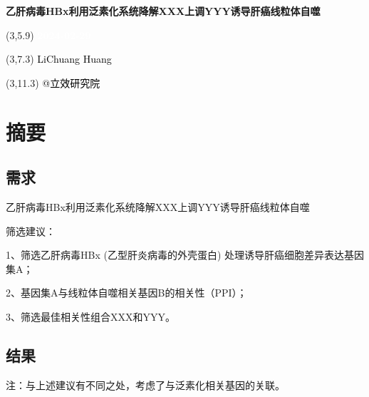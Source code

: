 \documentclass[
]{article}
\author{}
\date{\vspace{-2.5em}}
\begin{document}
\begin{titlepage} 
\begin{center} \textbf{\Huge
乙肝病毒HBx利用泛素化系统降解XXX上调YYY诱导肝癌线粒体自噬}
\vspace{4em} \begin{textblock}{10}(3,5.9) \huge
\textbf{\textcolor{white}{2024-02-29}}
\end{textblock} \begin{textblock}{10}(3,7.3)
\Large \textcolor{black}{LiChuang Huang}
\end{textblock} \begin{textblock}{10}(3,11.3)
\Large \textcolor{black}{@立效研究院}
\end{textblock} \end{center} \end{titlepage}
\restoregeometry


\tableofcontents

\listoffigures

\listoftables

\newpage


\hypertarget{abstract}{%
\section{摘要}\label{abstract}}

\hypertarget{ux9700ux6c42}{%
\subsection{需求}\label{ux9700ux6c42}}

乙肝病毒HBx利用泛素化系统降解XXX上调YYY诱导肝癌线粒体自噬

筛选建议：

1、筛选乙肝病毒HBx (乙型肝炎病毒的外壳蛋白) 处理诱导肝癌细胞差异表达基因集A；

2、基因集A与线粒体自噬相关基因B的相关性（PPI）；

3、筛选最佳相关性组合XXX和YYY。

\hypertarget{ux7ed3ux679c}{%
\subsection{结果}\label{ux7ed3ux679c}}

注：与上述建议有不同之处，考虑了与泛素化相关基因的关联。
\end{document}
